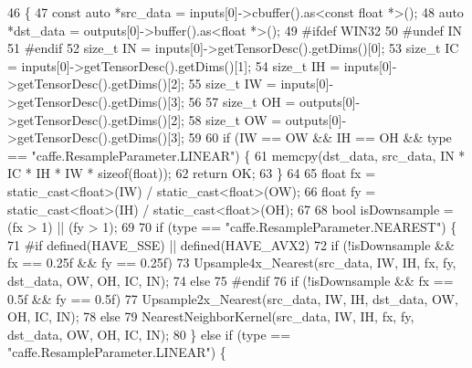 \begin{DoxyCode}
46                                                              \{
47         \textcolor{keyword}{const} \textcolor{keyword}{auto} *src\_data = inputs[0]->cbuffer().as<\textcolor{keyword}{const} \textcolor{keywordtype}{float} *>();
48         \textcolor{keyword}{auto} *dst\_data = outputs[0]->buffer().as<\textcolor{keywordtype}{float} *>();
49 \textcolor{preprocessor}{#ifdef WIN32}
50 \textcolor{preprocessor}{#undef IN}
51 \textcolor{preprocessor}{#endif}
52         \textcolor{keywordtype}{size\_t} IN = inputs[0]->getTensorDesc().getDims()[0];
53         \textcolor{keywordtype}{size\_t} IC = inputs[0]->getTensorDesc().getDims()[1];
54         \textcolor{keywordtype}{size\_t} IH = inputs[0]->getTensorDesc().getDims()[2];
55         \textcolor{keywordtype}{size\_t} IW = inputs[0]->getTensorDesc().getDims()[3];
56 
57         \textcolor{keywordtype}{size\_t} OH = outputs[0]->getTensorDesc().getDims()[2];
58         \textcolor{keywordtype}{size\_t} OW = outputs[0]->getTensorDesc().getDims()[3];
59 
60         \textcolor{keywordflow}{if} (IW == OW && IH == OH && type == \textcolor{stringliteral}{"caffe.ResampleParameter.LINEAR"}) \{
61             memcpy(dst\_data, src\_data, IN * IC * IH * IW * \textcolor{keyword}{sizeof}(\textcolor{keywordtype}{float}));
62             \textcolor{keywordflow}{return} OK;
63         \}
64 
65         \textcolor{keywordtype}{float} fx = \textcolor{keyword}{static\_cast<}\textcolor{keywordtype}{float}\textcolor{keyword}{>}(IW) / static\_cast<float>(OW);
66         \textcolor{keywordtype}{float} fy = \textcolor{keyword}{static\_cast<}\textcolor{keywordtype}{float}\textcolor{keyword}{>}(IH) / static\_cast<float>(OH);
67 
68         \textcolor{keywordtype}{bool} isDownsample = (fx > 1) || (fy > 1);
69 
70         \textcolor{keywordflow}{if} (type == \textcolor{stringliteral}{"caffe.ResampleParameter.NEAREST"}) \{
71 \textcolor{preprocessor}{#if defined(HAVE\_SSE) || defined(HAVE\_AVX2)}
72             \textcolor{keywordflow}{if} (!isDownsample && fx == 0.25f && fy == 0.25f)
73                 Upsample4x\_Nearest(src\_data, IW, IH, fx, fy, dst\_data, OW, OH, IC, IN);
74             \textcolor{keywordflow}{else}
75 \textcolor{preprocessor}{#endif}
76             \textcolor{keywordflow}{if} (!isDownsample && fx == 0.5f && fy == 0.5f)
77                 Upsample2x\_Nearest(src\_data, IW, IH, dst\_data, OW, OH, IC, IN);
78             \textcolor{keywordflow}{else}
79                 NearestNeighborKernel(src\_data, IW, IH, fx, fy, dst\_data, OW, OH, IC, IN);
80         \} \textcolor{keywordflow}{else} \textcolor{keywordflow}{if} (type == \textcolor{stringliteral}{"caffe.ResampleParameter.LINEAR"}) \{

\end{DoxyCode}

